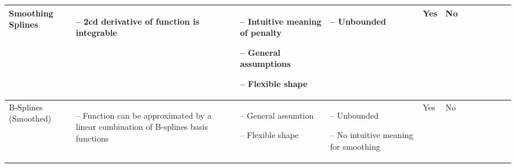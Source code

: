 \begin{table}[!ht]
\begin{tabular}{p{1.6cm}p{3.3cm}p{3.3cm}p{3.4cm}p{0.4cm}p{0.4cm}p{3cm}p{3cm}p{3cm}p{3cm}p{2.7cm}p{3cm}|}
		Smoothing Splines                                                                                                                                            &
		\begin{cptitemize} \item[--]  2cd derivative of function is integrable                                                        \end{cptitemize}               &
		\begin{cptitemize} \item[--]  Intuitive meaning of penalty \item[--]  General assumptions \item[--]  Flexible shape                         \end{cptitemize} &
		\begin{cptitemize} \item[--]  Unbounded                                                                                       \end{cptitemize}               &
		Yes                                                                                                                                                          &
		No                                                                                                                                                             \\ \hline%

		B-Splines (Smoothed)                                                                                                                                         &
		\begin{cptitemize} \item[--]  Function can be approximated by a linear combination of B-splines basis functions               \end{cptitemize}               &
		\begin{cptitemize} \item[--]  General assumtion \item[--]  Flexible shape                                                            \end{cptitemize}        &
		\begin{cptitemize} \item[--]  Unbounded \item[--]  No intuitive meaning for smoothing                                                \end{cptitemize}        &
		Yes                                                                                                                                                            &
		No                                                                                                                                                             \\ \hline%


\end{tabular}
\end{table}
